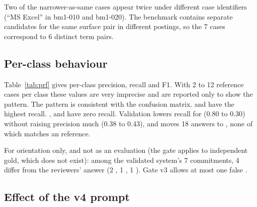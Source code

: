 \begin{table}[H]
\centering
\small
\renewcommand{\arraystretch}{1.1}

\caption[{The three most frequent error categories of the v3 raw answers}]{The three most frequent error categories of the v3 raw answers. The counts 7, 5 and 4 reproduce the figures reported during development.}
\label{tab:errorcases}
\end{table}

Two of the narrower-as-same cases appear twice under different case identifiers (``MS Excel'' in bm1-010 and bm1-020). The benchmark contains separate candidates for the same surface pair in different postings, so the 7 cases correspond to 6 distinct term pairs.

\subsection{Per-class behaviour}

Table~\ref{tab:prf} gives per-class precision, recall and F1. With 2 to 12 reference cases per class these values are very imprecise and are reported only to show the pattern. The pattern is consistent with the confusion matrix. \UN{} and \SC{} have the highest recall. \PA, \CH{} and \PO{} have zero recall. Validation lowers recall for \SC{} (0.80 to 0.30) without raising precision much (0.38 to 0.43), and moves 18 answers to \IE, none of which matches an \IE{} reference.

\begin{table}[H]
\centering
\small
\resizebox{\textwidth}{!}{}
\caption[{Per-class precision, recall and F1, v3 raw and validated answers}]{Per-class precision (P), recall (R) and F1 for v3 raw and validated answers. ``--'': undefined because the class was never predicted, or never in the reference. Macro-F1 averages over the 7 classes present in the reference, counting undefined F1 as 0.}
\label{tab:prf}
\end{table}

For orientation only, and not as an evaluation (the gate applies to independent gold, which does not exist): among the validated system's 7 \SC{} commitments, 4 differ from the reviewers' answer (2 \PO, 1 \CH, 1 \RE). Gate v3 allows at most one false \SC.

\subsection{Effect of the v4 prompt}


